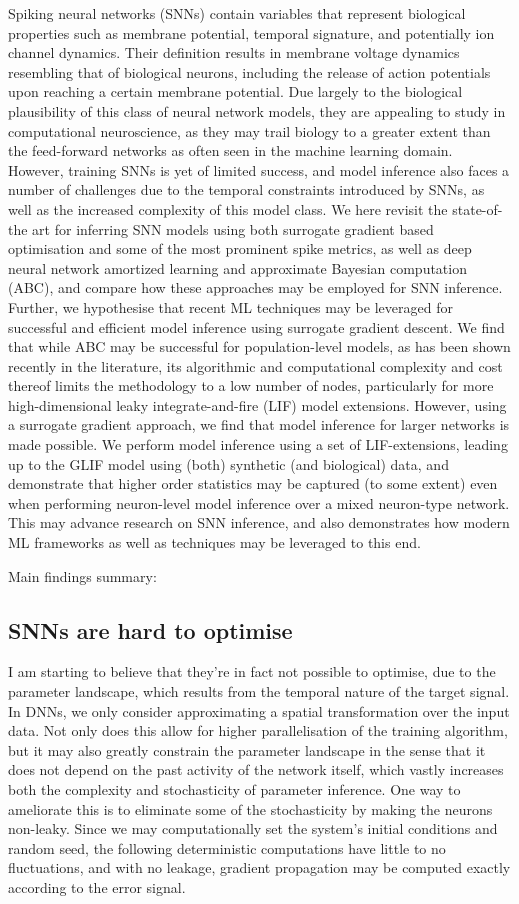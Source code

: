 \documentclass[mphil,deptreport,ai]{infthesis} %
\begin{document}
Spiking neural networks (SNNs) contain variables that represent biological properties such as membrane potential, temporal signature, and potentially ion channel dynamics. Their definition results in membrane voltage dynamics resembling that of biological neurons, including the release of action potentials upon reaching a certain membrane potential.
Due largely to the biological plausibility of this class of neural network models, they are appealing to study in computational neuroscience, as they may trail biology to a greater extent than the feed-forward networks as often seen in the machine learning domain.
However, training SNNs is yet of limited success, and model inference also faces a number of challenges due to the temporal constraints introduced by SNNs, as well as the increased complexity of this model class.
We here revisit the state-of-the art for inferring SNN models using both surrogate gradient based optimisation and some of the most prominent spike metrics, as well as deep neural network amortized learning and approximate Bayesian computation (ABC), and compare how these approaches may be employed for SNN inference. Further, we hypothesise that recent ML techniques may be leveraged for successful and efficient model inference using surrogate gradient descent.
We find that while ABC may be successful for population-level models, as has been shown recently in the literature, its algorithmic and computational complexity and cost thereof limits the methodology to a low number of nodes, particularly for more high-dimensional leaky integrate-and-fire (LIF) model extensions.
However, using a surrogate gradient approach, we find that model inference for larger networks is made possible. We perform model inference using a set of LIF-extensions, leading up to the GLIF model using (both) synthetic (and biological) data, and demonstrate that higher order statistics may be captured (to some extent) even when performing neuron-level model inference over a mixed neuron-type network.
This may advance research on SNN inference, and also demonstrates how modern ML frameworks as well as techniques may be leveraged to this end.

Main findings summary:
\subsection{SNNs are hard to optimise}
I am starting to believe that they’re in fact not possible to optimise, due to the parameter landscape, which results from the temporal nature of the target signal.
In DNNs, we only consider approximating a spatial transformation over the input data. Not only does this allow for higher parallelisation of the training algorithm, but it may also greatly constrain the parameter landscape in the sense that it does not depend on the past activity of the network itself, which vastly increases both the complexity and stochasticity of parameter inference. 
One way to ameliorate this is to eliminate some of the stochasticity by making the neurons non-leaky. Since we may computationally set the system’s initial conditions and random seed, the following deterministic computations have little to no fluctuations, and with no leakage, gradient propagation may be computed exactly according to the error signal.
\end{document}
